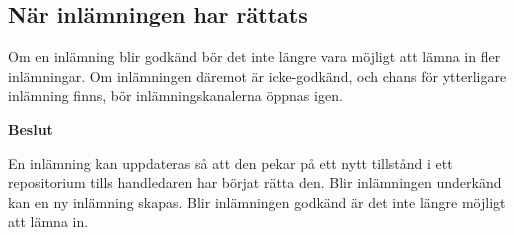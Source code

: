 \subsection{När inlämningen har rättats}
Om en inlämning blir godkänd bör det inte längre vara möjligt att lämna in fler inlämningar. Om inlämningen däremot är icke-godkänd, och chans för ytterligare inlämning finns, bör inlämningskanalerna öppnas igen.

\begin{flushright}

  \textbf{Beslut}

  En inlämning kan uppdateras så att den pekar på ett nytt tillstånd i ett repositorium tills handledaren har börjat rätta den. Blir inlämningen underkänd kan en ny inlämning skapas. Blir inlämningen godkänd är det inte längre möjligt att lämna in.
\end{flushright}
